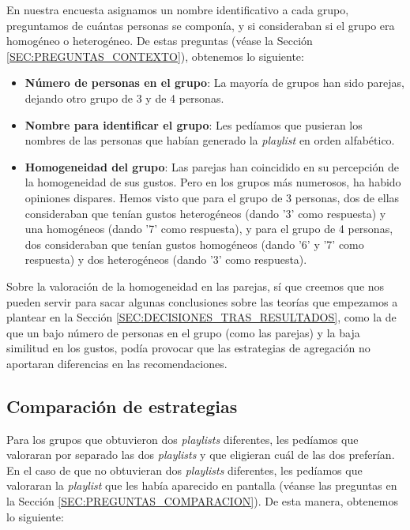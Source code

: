 En nuestra encuesta asignamos un nombre identificativo a cada grupo, preguntamos de cuántas personas se componía, 
y si consideraban si el grupo era homogéneo o heterogéneo. De estas preguntas (véase la Sección \ref{SEC:PREGUNTAS_CONTEXTO}), obtenemos lo siguiente:

\begin{itemize}
    \item \textbf{Número de personas en el grupo}: La mayoría de grupos han sido parejas, dejando otro grupo de 3 y de 4 personas.
    \item \textbf{Nombre para identificar el grupo}: Les pedíamos que pusieran los nombres de las personas que habían generado la \textit{playlist} en orden alfabético.
    \item \textbf{Homogeneidad del grupo}: Las parejas han coincidido en su percepción de la homogeneidad de sus gustos. Pero en los grupos
    más numerosos, ha habido opiniones dispares. Hemos visto que para el grupo de 3 personas, dos de ellas consideraban que tenían gustos heterogéneos (dando '3' como respuesta) 
    y una homogéneos (dando '7' como respuesta), 
    y para el grupo de 4 personas, dos consideraban que tenían gustos homogéneos (dando '6' y '7' como respuesta) y dos heterogéneos (dando '3' como respuesta).

\end{itemize}

Sobre la valoración de la homogeneidad en las parejas, sí que creemos que nos pueden servir para sacar algunas
conclusiones sobre las teorías que empezamos a plantear en la Sección \ref{SEC:DECISIONES_TRAS_RESULTADOS}, como la de que 
un bajo número de personas en el grupo (como las parejas) y la baja similitud en los gustos, podía provocar que 
las estrategias de agregación no aportaran diferencias en las recomendaciones.

\subsection{Comparación de estrategias\label{SEC:COMPARACION_ESTRATEGIAS}}

Para los grupos que obtuvieron dos \textit{playlists} diferentes, les pedíamos que valoraran por separado las dos \textit{playlists} 
y que eligieran cuál de las dos preferían. En el caso de que no obtuvieran dos \textit{playlists} diferentes, les pedíamos que 
valoraran la \textit{playlist} que les había aparecido en pantalla (véanse las preguntas en la Sección \ref{SEC:PREGUNTAS_COMPARACION}). 
De esta manera, obtenemos lo siguiente:

